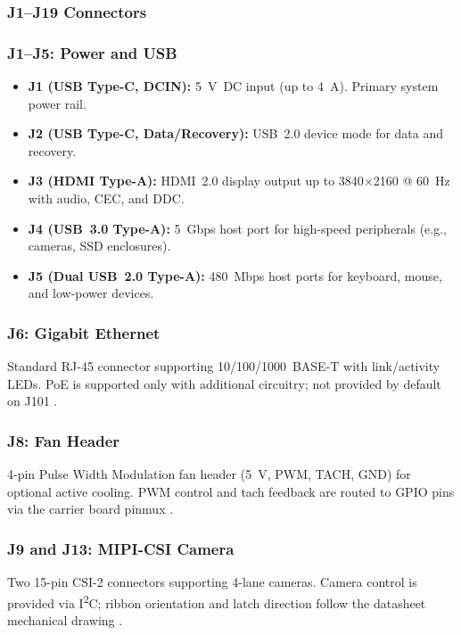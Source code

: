 \subsubsection{J1--J19 Connectors }

\subsubsection{J1--J5: Power and \ac{USB}}
\begin{itemize}
	\item \textbf{J1 (\ac{USB} Type-C, DCIN):} 5~V~DC input (up to 4~A). Primary system power rail. 
	\item \textbf{J2 (\ac{USB} Type-C, Data/Recovery):} \ac{USB}~2.0 device mode for data and recovery.
	\item \textbf{J3 (\ac{HDMI} Type-A):} \ac{HDMI}~2.0 display output up to 3840$\times$2160 @ 60~Hz with audio, CEC, and DDC.
	\item \textbf{J4 (\ac{USB}~3.0 Type-A):} 5~Gbps host port for high-speed peripherals (e.g., cameras, SSD enclosures).
	\item \textbf{J5 (Dual \ac{USB}~2.0 Type-A):} 480~Mbps host ports for keyboard, mouse, and low-power devices.
\end{itemize}

\subsubsection{J6: Gigabit Ethernet}
Standard RJ-45 connector supporting 10/100/1000~BASE-T with link/activity \ac{LED}s. PoE is supported only with additional circuitry; not provided by default on J101 \cite{seeedJ101Manual}.

\subsubsection{J8: Fan Header}
4-pin Pulse Width Modulation fan header (5~V, \ac{PWM}, TACH, GND) for optional active cooling. \ac{PWM} control and tach feedback are routed to \ac{GPIO} pins via the carrier board pinmux \cite{seeedJ101Manual}.

\subsubsection{J9 and J13: MIPI-\ac{CSI} Camera}
Two 15-pin \ac{CSI}-2 connectors supporting 4-lane cameras. Camera control is provided via I\textsuperscript{2}C; ribbon orientation and latch direction follow the datasheet mechanical drawing \cite{seeedJ101Manual,reComputer_HardwareLayout}.

